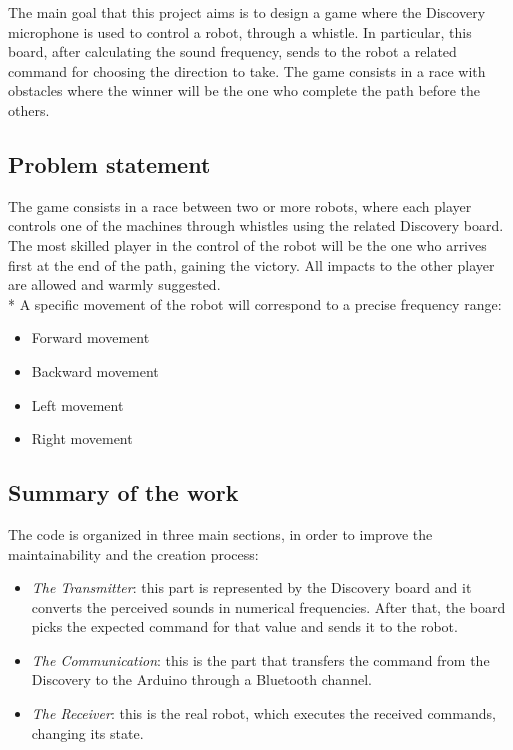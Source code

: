 The main goal that this project aims is to design a game where the Discovery microphone is used to control a robot, through a whistle. In particular, this board, after calculating the sound frequency, sends to the robot a related command for choosing the direction to take. The game consists in a race with obstacles where the winner will be the one who complete the path before the others.

\subsection{Problem statement}
The game consists in a race between two or more robots, where each player controls one of the machines through whistles using the related Discovery board. The most skilled player in the control of the robot will be the one who arrives first at the end of the path, gaining the victory. All impacts to the other player are allowed and warmly suggested.\\*
A specific movement of the robot will correspond to a precise frequency range:
\begin{itemize}
	\item Forward movement
	\item Backward movement
	\item Left movement
	\item Right movement
\end{itemize}

\subsection{Summary of the work}
The code is organized in three main sections, in order to improve the maintainability and the creation process:
\begin{itemize}
	\item \textit{The Transmitter}: this part is represented by the Discovery board and it converts the perceived sounds in numerical frequencies. After that, the board picks the expected command for that value and sends it to the robot.
	\item \textit{The Communication}: this is the part that transfers the command from the Discovery to the Arduino through a Bluetooth channel.
	\item \textit{The Receiver}: this is the real robot, which executes the received commands, changing its state.
\end{itemize}

